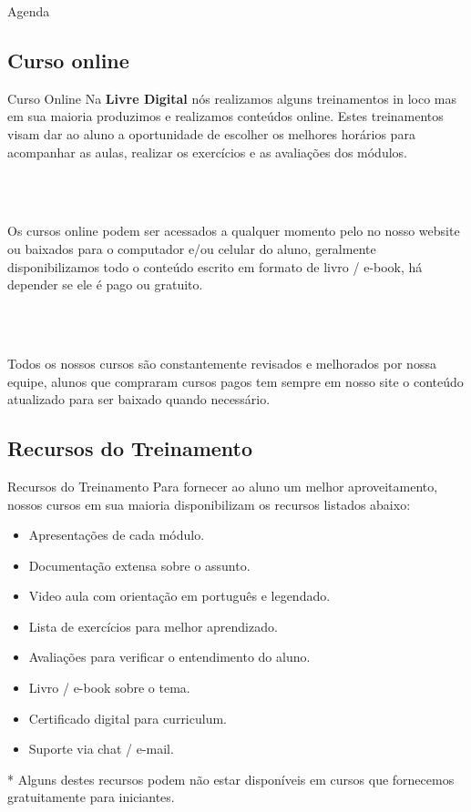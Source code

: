 \documentclass{beamer}
\begin{document}
\begin{frame}{Agenda}
  \linespread{2.5}
  \tableofcontents
\end{frame}

\subsection[]{Curso online}

\begin{frame}{Curso Online}
  Na \textbf{Livre Digital} nós realizamos alguns treinamentos in loco mas em sua
  maioria produzimos e realizamos conteúdos online. Estes treinamentos visam dar
  ao aluno a oportunidade de escolher os melhores horários para acompanhar as aulas,
  realizar os exercícios e as avaliações dos módulos.

  \\~\

  Os cursos online podem ser acessados a qualquer momento pelo no nosso website
  ou baixados para o computador e/ou celular do aluno, geralmente disponibilizamos
  todo o conteúdo escrito em formato de livro / e-book, há depender se ele é pago
  ou gratuito.

  \\~\

  Todos os nossos cursos são constantemente revisados e melhorados por nossa equipe,
  alunos que compraram cursos pagos tem sempre em nosso site o conteúdo atualizado
  para ser baixado quando necessário.
\end{frame}

\subsection[]{Recursos do Treinamento}

\begin{frame}{Recursos do Treinamento}
  Para fornecer ao aluno um melhor aproveitamento, nossos cursos em sua maioria
  disponibilizam os recursos listados abaixo:

  \begin{itemize}
    \item Apresentações de cada módulo.
    \item Documentação extensa sobre o assunto.
    \item Video aula com orientação em português e legendado.
    \item Lista de exercícios para melhor aprendizado.
    \item Avaliações para verificar o entendimento do aluno.
    \item Livro / e-book sobre o tema.
    \item Certificado digital para curriculum.
    \item Suporte via chat / e-mail.
  \end{itemize}

  * Alguns destes recursos podem não estar disponíveis em cursos que fornecemos
  gratuitamente para iniciantes.
\end{frame}
\end{document}
